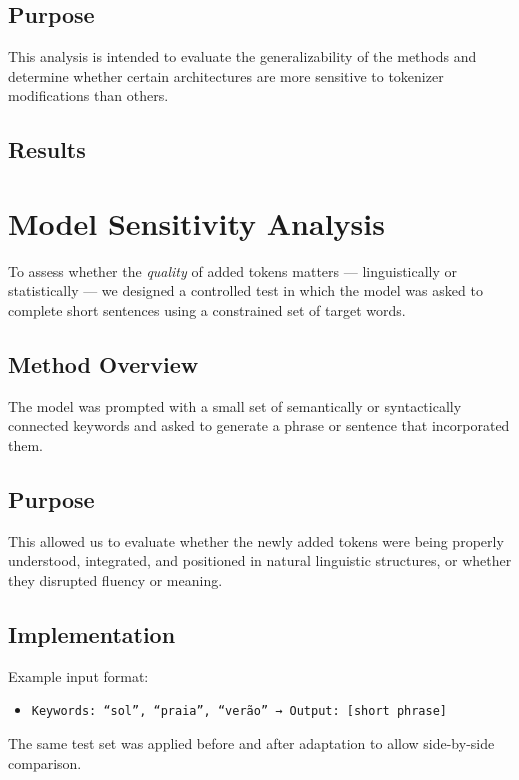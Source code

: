 \subsection{Purpose}
This analysis is intended to evaluate the generalizability of the methods and determine whether certain architectures are more sensitive to tokenizer modifications than others.

\subsection{Results}

\section{Model Sensitivity Analysis}
\label{sec:token_quality_test}

To assess whether the \textit{quality} of added tokens matters — linguistically or statistically — we designed a controlled test in which the model was asked to complete short sentences using a constrained set of target words.

\subsection{Method Overview}
The model was prompted with a small set of semantically or syntactically connected keywords and asked to generate a phrase or sentence that incorporated them.

\subsection{Purpose}
This allowed us to evaluate whether the newly added tokens were being properly understood, integrated, and positioned in natural linguistic structures, or whether they disrupted fluency or meaning.

\subsection{Implementation}
Example input format:
\begin{itemize}
    \item \texttt{Keywords: “sol”, “praia”, “verão” → Output: [short phrase]}
\end{itemize}

The same test set was applied before and after adaptation to allow side-by-side comparison.

